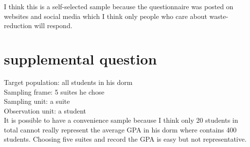 \documentclass{article}
\begin{document}
I think this is a self-selected sample because the questionnaire was posted on websites and social media which I think only people who care about waste-reduction will respond.

\section*{supplemental question}
Target population: all students in his dorm\\
Sampling frame: 5 suites he chose\\
Sampling unit: a suite\\
Observation unit: a student\\

It is possible to have a convenience sample because I think only 20 students in total cannot really represent the average GPA in his dorm where contains 400 students. Choosing five suites and record the GPA is easy but not representative.     
\end{document}
